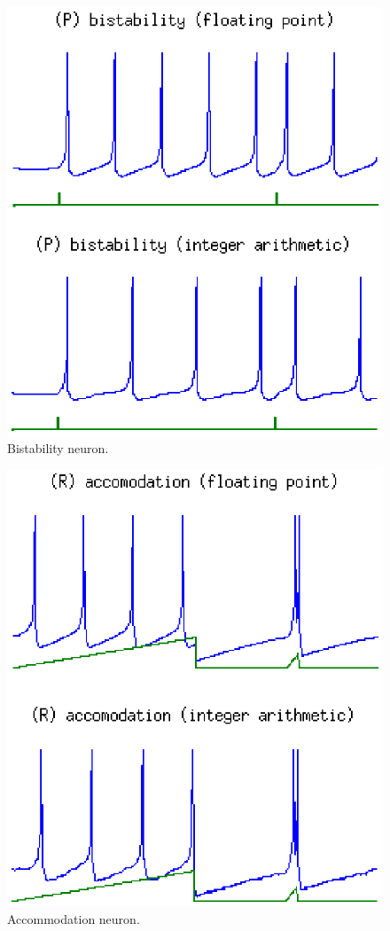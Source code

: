 \documentclass[journal]{./sty/IEEEtran}
\begin{document}
\begin{figure}
\centering
\includegraphics[scale=0.6]{imgs/izh_bistability}
\caption{Bistability neuron.\label{fig:bistable}}
\end{figure}

\begin{figure}
\centering
\includegraphics[scale=0.6]{imgs/izh_accomodation}
\caption{Accommodation neuron.\label{fig:accomod8}}
\end{figure}
\end{document}
